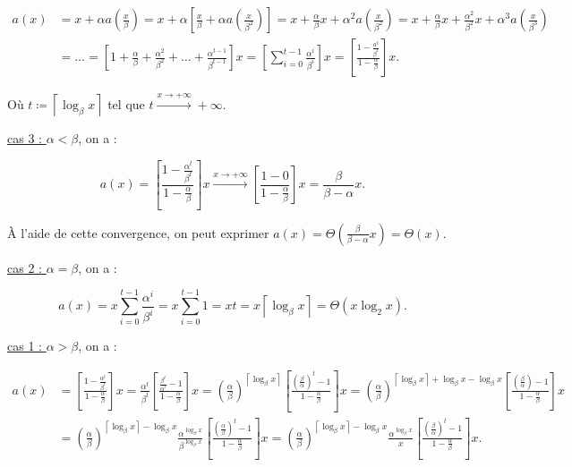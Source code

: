 \documentclass{article}
\newcommand{\ceil}[1]{{\left\lceil#1\right\rceil}}
\begin{document}
			\begin{align*}
				a(x) &= x + \alpha a\left(\frac x\beta\right) = x + \alpha\left[\frac x\beta + \alpha a\left(\frac x{\beta^2}\right)\right] = x + \frac \alpha\beta x + \alpha^2 a\left(\frac x{\beta^2}\right) = x + \frac \alpha\beta x + \frac {\alpha^2}{\beta^2}x + \alpha^3 a\left(\frac x{\beta^3}\right) \\
					 &= \ldots = \left[1 + \frac \alpha\beta + \frac {\alpha^2}{\beta^2} + \ldots + \frac {\alpha^{t-1}}{\beta^{t-1}}\right]x = \left[\sum_{i=0}^{t-1}\frac {\alpha^i}{\beta^i}\right]x = \left[\frac {1 - \frac {a^t}{\beta^t}}{1 - \frac \alpha\beta}\right]x.
			\end{align*}

			Où $t \coloneqq \ceil{\log_\beta x}$ tel que $t \stackrel{x\to+\infty}{\longrightarrow}+\infty$.

			\underline{cas 3 : } $\alpha < \beta$, on a :

			\[a(x) = \left[\frac {1 - \frac {\alpha^t}{\beta^t}}{1 - \frac \alpha\beta}\right]x \stackrel{x\to+\infty}\longrightarrow \left[\frac {1 - 0}{1 - \frac \alpha\beta}\right]x = \frac \beta{\beta - \alpha}x.\]

			À l'aide de cette convergence, on peut exprimer $a(x) = \Theta\left(\frac \beta{\beta-\alpha}x\right) = \Theta(x)$.

			\underline{cas 2 : } $\alpha= \beta$, on a :

			\[a(x) = x\sum_{i=0}^{t-1}\frac {\alpha^i}{\beta^i} = x\sum_{i=0}^{t-1}1 = xt =x\ceil{\log_\beta x} = \Theta(x\log_2 x).\]

			\underline {cas 1 : } $\alpha > \beta$, on a :

			\begin{align*}
				a(x) &= \left[\frac {1 - \frac {\alpha^t}{\beta^t}}{1 - \frac \alpha\beta}\right]x = \frac {\alpha^t}{\beta^t}\left[\frac {\frac {\beta^t}{\alpha^t} - 1}{1 - \frac \alpha\beta}\right]x
				= \left(\frac \alpha\beta\right)^\ceil{\log_\beta x}\left[\frac {\left(\frac \beta\alpha\right)^t - 1}{1 - \frac \alpha\beta}\right]x
				= \left(\frac \alpha\beta\right)^{\ceil{\log_\beta x} + \log_\beta x - \log_\beta x}\left[\frac {\left(\frac \beta\alpha\right) - 1}{1 - \frac \alpha\beta}\right]x \\
					 &= \left(\frac \alpha\beta\right)^{\ceil{\log_\beta x} - \log_\beta x}\frac {\alpha^{\log_\beta x}}{\beta^{\log_\beta x}}\left[\frac {\left(\frac \alpha\beta\right)^t - 1}{1 - \frac \alpha\beta}\right]x = \left(\frac \alpha\beta\right)^{\ceil{\log_\beta x} - \log_\beta x}\frac {\alpha^{\log_\beta x}}x\left[\frac {\left(\frac \beta\alpha\right)^t - 1}{1-\frac \alpha\beta}\right]x.
			\end{align*}
\end{document}
